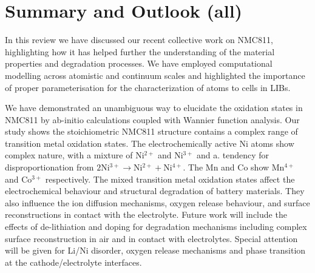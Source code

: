 \documentclass[journal=jacsat,manuscript=article]{achemso}
\begin{document}
\section{Summary and Outlook (all)}

In this review we have discussed our recent collective work on NMC811, highlighting how it has helped further the understanding of the material properties and degradation processes. We have employed computational modelling across atomistic and continuum scales and highlighted  the importance of proper parameterisation for the characterization of atoms to cells in LIBs.

We have demonstrated an unambiguous way to elucidate the oxidation states in NMC811 by ab-initio calculations coupled with Wannier function analysis. Our study shows the stoichiometric NMC811 structure contains a complex range of transition metal oxidation states. The electrochemically active Ni atoms show complex nature, with a mixture of Ni$^{2+}$ and Ni$^{3+}$ and a. tendency for disproportionation from $2$Ni$^{3+}\rightarrow$Ni$^{2+} + $Ni$^{4+}$. The Mn and Co show Mn$^{4+}$ and Co$^{3+}$ respectively. The mixed transition metal oxidation states affect the electrochemical behaviour and structural degradation of battery materials. They also influence the ion diffusion mechanisms, oxygen release behaviour, and surface reconstructions in contact with the electrolyte. 
Future work will include the effects of de-lithiation and doping for degradation mechanisms including complex surface reconstruction in air and in contact with electrolytes. Special attention will be given for Li/Ni disorder, oxygen release mechanisms and phase transition at the cathode/electrolyte interfaces. 
\end{document}
